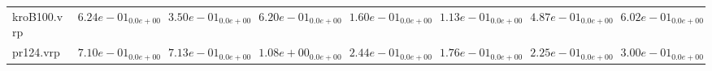 \documentclass{article}
\begin{document}
\begin{table}
\begin{scriptsize}
\begin{tabular}{llllllll}
kroB100.vrp & $  6.24e-01_{ 0.0e+00}$ & $  3.50e-01_{ 0.0e+00}$ & $  6.20e-01_{ 0.0e+00}$ & \cellcolor{gray25}$  1.60e-01_{ 0.0e+00}$ & \cellcolor{gray95}$  1.13e-01_{ 0.0e+00}$ & $  4.87e-01_{ 0.0e+00}$ & $  6.02e-01_{ 0.0e+00}$ \\
pr124.vrp & $  7.10e-01_{ 0.0e+00}$ & $  7.13e-01_{ 0.0e+00}$ & $  1.08e+00_{ 0.0e+00}$ & $  2.44e-01_{ 0.0e+00}$ & \cellcolor{gray95}$  1.76e-01_{ 0.0e+00}$ & \cellcolor{gray25}$  2.25e-01_{ 0.0e+00}$ & $  3.00e-01_{ 0.0e+00}$ \\
\hline
\end{tabular}
\end{scriptsize}
\end{table}
\end{document}
